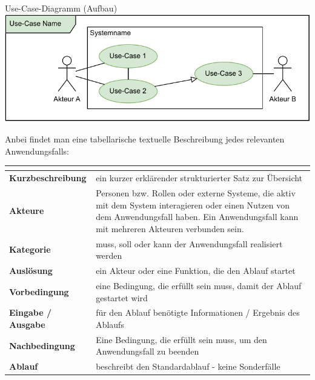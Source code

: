 \begin{defi}{Use-Case-Diagramm (Aufbau)}
    \includegraphics[width=\textwidth]{includes/figures/defi_diagrams_use_case_intro.pdf}

    Anbei findet man eine tabellarische textuelle Beschreibung jedes relevanten Anwendungsfalls:

    \begin{tabularx}{\textwidth}{|>{\bfseries}l|X|}
        \hline
        \multicolumn{2}{|l|}{Use-Case-Nummer, Use-Case-Name}                                                                                                 \\\hline\hline
        Kurzbeschreibung  & ein kurzer erklärender strukturierter Satz zur Übersicht                                                                         \\\hline
        Akteure           & Personen bzw. Rollen oder externe Systeme, die aktiv mit dem System interagieren oder einen Nutzen von dem Anwendungsfall haben.
        Ein Anwendungsfall kann mit mehreren Akteuren verbunden sein.                                                                                        \\\hline
        Kategorie         & muss, soll oder kann der Anwendungsfall realisiert werden                                                                        \\\hline
        Auslösung         & ein Akteur oder eine Funktion, die den Ablauf startet                                                                            \\\hline
        Vorbedingung      & eine Bedingung, die erfüllt sein muss, damit der Ablauf gestartet wird                                                           \\\hline
        Eingabe / Ausgabe & für den Ablauf benötigte Informationen / Ergebnis des Ablaufs                                                                    \\\hline
        Nachbedingung     & Eine Bedingung, die erfüllt sein muss, um den Anwendungsfall zu beenden                                                          \\\hline
        Ablauf            & beschreibt den Standardablauf - keine Sonderfälle                                                                                \\\hline
    \end{tabularx}
\end{defi}

